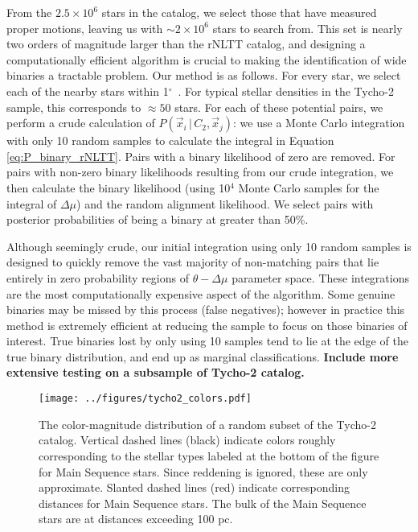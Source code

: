 \documentclass[usenatbib]{mnras}
\newcommand{\given}{\,|\,}
\newcommand{\degree}{\ifmmode {^\circ}\else$^\circ$\ \fi}
\begin{document}
From the $2.5\times10^6$ stars in the catalog, we select those that have measured proper motions, leaving us with $\sim2\times10^6$ stars to search from. This set is nearly two orders of magnitude larger than the rNLTT catalog, and designing a computationally efficient algorithm is crucial to making the identification of wide binaries a tractable problem. Our method is as follows. For every star, we select each of the nearby stars within 1\degree. For typical stellar densities in the Tycho-2 sample, this corresponds to $\approx50$ stars. For each of these potential pairs, we perform a crude calculation of $P(\vec{x}_i \given C_2, \vec{x}_j)$: we use a Monte Carlo integration with only 10 random samples to calculate the integral in Equation \ref{eq:P_binary_rNLTT}. Pairs with a binary likelihood of zero are removed. For pairs with non-zero binary likelihoods resulting from our crude integration, we then calculate the binary likelihood (using 10$^4$ Monte Carlo samples for the integral of $\Delta \mu$) and the random alignment likelihood. We select pairs with posterior probabilities of being a binary at greater than 50\%.


Although seemingly crude, our initial integration using only 10 random samples is designed to quickly remove the vast majority of non-matching pairs that lie entirely in zero probability regions of $\theta-\Delta \mu$ parameter space. These integrations are the most computationally expensive aspect of the algorithm. Some genuine binaries may be missed by this process (false negatives); however in practice this method is extremely efficient at reducing the sample to focus on those binaries of interest. True binaries lost by only using 10 samples tend to lie at the edge of the true binary distribution, and end up as marginal classifications. {\bf Include more extensive testing on a subsample of Tycho-2 catalog.}

 
 
 
\begin{figure}[h!]
\begin{center}
\texttt{[image: ../figures/tycho2\_colors.pdf]}
\caption{ The color-magnitude distribution of a random subset of the Tycho-2 catalog. Vertical dashed lines (black) indicate colors roughly corresponding to the stellar types labeled at the bottom of the figure for Main Sequence stars. Since reddening is ignored, these are only approximate. Slanted dashed lines (red) indicate corresponding distances for Main Sequence stars. The bulk of the Main Sequence stars are at distances exceeding 100 pc.}
\label{fig:tycho-2_color_mag}
\end{center}
\end{figure}
\end{document}
